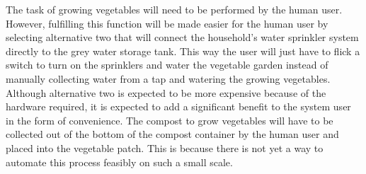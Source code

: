 \documentclass[a4paper,11pt,fleqn]{report}
\begin{document}
The task of growing vegetables will need to be performed by the human user. However, fulfilling this function will be made easier for the human user by selecting alternative two that will connect the household's water sprinkler system directly to the grey water storage tank. This way the user will just have to flick a switch to turn on the sprinklers and water the vegetable garden instead of manually collecting water from a tap and watering the growing vegetables. Although alternative two is expected to be more expensive because of the hardware required, it is expected to add a significant benefit to the system user in the form of convenience. The compost to grow vegetables will have to be collected out of the bottom of the compost container by the human user and placed into the vegetable patch. This is because there is not yet a way to automate this process feasibly on such a small scale.
\end{document}
